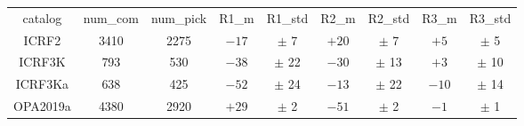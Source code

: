 \begin{table}
\begin{tabular}{ccccccccc}
catalog & num_com & num_pick & R1_m & R1_std & R2_m & R2_std & R3_m & R3_std \\
ICRF2 & 3410 & 2275 & $ -17$ & $\pm$  7 & $ +20$ & $\pm$  7 & $  +5$ & $\pm$  5 \\
ICRF3K & 793 & 530 & $ -38$ & $\pm$ 22 & $ -30$ & $\pm$ 13 & $  +3$ & $\pm$ 10 \\
ICRF3Ka & 638 & 425 & $ -52$ & $\pm$ 24 & $ -13$ & $\pm$ 22 & $ -10$ & $\pm$ 14 \\
OPA2019a & 4380 & 2920 & $ +29$ & $\pm$  2 & $ -51$ & $\pm$  2 & $  -1$ & $\pm$  1 \\
\end{tabular}
\end{table}
